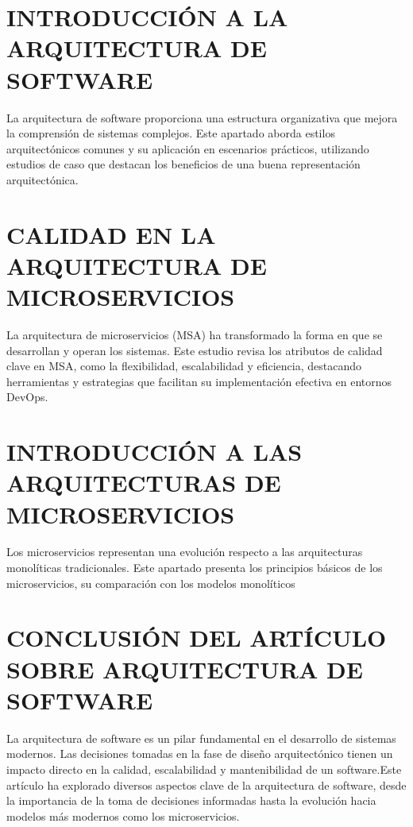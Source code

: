 \documentclass{IEEEoj-data}
\begin{document}
\section*{INTRODUCCI\'ON A LA ARQUITECTURA DE SOFTWARE}

La arquitectura de software proporciona una estructura organizativa que mejora la comprensi\'on de sistemas complejos. Este apartado aborda estilos arquitect\'onicos comunes y su aplicaci\'on en escenarios pr\'acticos, utilizando estudios de caso que destacan los beneficios de una buena representaci\'on arquitect\'onica.

\section*{CALIDAD EN LA ARQUITECTURA DE MICROSERVICIOS}

La arquitectura de microservicios (MSA) ha transformado la forma en que se desarrollan y operan los sistemas. Este estudio revisa los atributos de calidad clave en MSA, como la flexibilidad, escalabilidad y eficiencia, destacando herramientas y estrategias que facilitan su implementaci\'on efectiva en entornos DevOps.

\section*{INTRODUCCI\'ON A LAS ARQUITECTURAS DE MICROSERVICIOS}

Los microservicios representan una evoluci\'on respecto a las arquitecturas monol\'iticas tradicionales. Este apartado presenta los principios b\'asicos de los microservicios, su comparaci\'on con los modelos monol\'iticos

\section*{CONCLUSIÓN DEL ARTÍCULO SOBRE ARQUITECTURA DE SOFTWARE}

La arquitectura de software es un pilar fundamental en el desarrollo de sistemas modernos. Las decisiones tomadas en la fase de diseño arquitectónico tienen un impacto directo en la calidad, escalabilidad y mantenibilidad de un software.Este artículo ha explorado diversos aspectos clave de la arquitectura de software, desde la importancia de la toma de decisiones informadas hasta la evolución hacia modelos más modernos como los microservicios.
\end{document}
